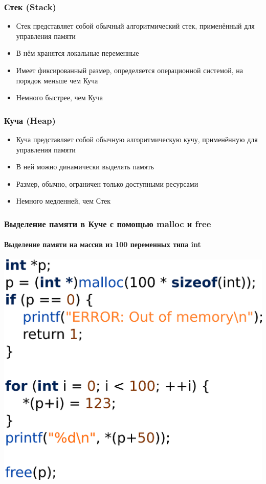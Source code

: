 \documentclass[14pt,pdf,hyperref={unicode}]{beamer}
\begin{document}
\begin{frame}[fragile]
\frametitle{Стек (Stack)} 
\begin{itemize}
\item Стек представляет собой обычный алгоритмический стек, применённый для управления памяти
\item В нём хранятся локальные переменные
\item Имеет фиксированный размер, определяется операционной системой, на порядок меньше чем Куча
\item Немного быстрее, чем Куча
\end{itemize}
\end{frame}

\begin{frame}[fragile]
\frametitle{Куча (Heap)} 
\begin{itemize}
\item Куча представляет собой обычную алгоритмическую кучу, применённую для управления памяти
\item В ней можно динамически выделять память
\item Размер, обычно, ограничен только доступными ресурсами
\item Немного медленней, чем Стек
\end{itemize}
\end{frame}


\begin{frame}[fragile]
\frametitle{Выделение памяти в Куче с помощью malloc и free} 
\framesubtitle{Выделение памяти на массив из 100 переменных типа int} 
\begin{center}
\includegraphics[width=0.55\linewidth]{images/malloc_free_2.png}
\end{center}
\end{frame}
\end{document}
